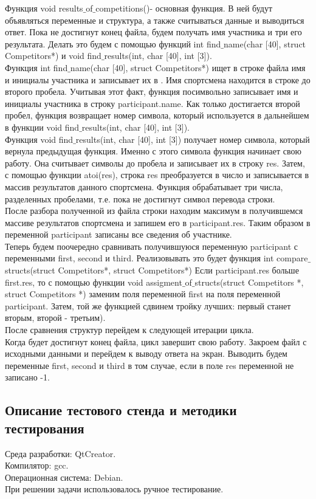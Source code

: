 \documentclass[12pt,a4paper]{report}
\begin{document}
Функция void results$\_$of$\_$competitions()- основная функция. В ней будут объявляться переменные и структура, а также считываться данные и выводиться ответ. Пока не достигнут конец файла, будем получать имя участника и три его результата. Делать это будем с помощью функций int find$\_$name(char [40], struct Competitors*) и void find$\_$results(int, char [40], int [3]).\\
Функция int find$\_$name(char [40], struct Competitors*) ищет в строке файла имя и инициалы участника и записывает их в . Имя спортсмена находится в строке до второго пробела. Учитывая этот факт, функция посимвольно записывает имя и инициалы участника в строку participant.name. Как только достигается второй пробел, функция возвращает номер символа, который используется в дальнейшем в функции void find$\_$results(int, char [40], int [3]).\\
Функция void find$\_$results(int, char [40], int [3]) получает номер символа, который вернула предыдущая функция. Именно с этого символа функция начинает свою работу. Она считывает символы до пробела и записывает их в строку res. Затем, с помощью функции atoi(res), строка res преобразуется в число и записывается в массив результатов данного спортсмена. Функция обрабатывает три числа, разделенных пробелами, т.е. пока не достигнут символ перевода строки. \\
После разбора полученной из файла строки находим максимум в получившемся массиве результатов спортсмена и запишем его в participant.res. Таким образом в переменной participant записаны все сведения об участнике. \\
Теперь будем поочередно сравнивать получившуюся переменную participant с переменными first, second и third. Реализовывать это будет функция int compare$\_$structs(struct Competitors*, struct Competitors*) Если participant.res больше first.res, то с помощью функции void assigment$\_$of$\_$structs(struct Competitors *, struct Competitors *) заменим поля переменной first на поля переменной participant. Затем, той же функцией сдвинем тройку лучших: первый станет вторым, второй - третьим). \\
После сравнения структур перейдем к следующей итерации цикла. \\
Когда будет достигнут конец файла, цикл завершит свою работу. Закроем файл с исходными данными и перейдем к выводу ответа на экран. Выводить будем переменные first, second и third в том случае, если в поле res переменной не записано -1. 
\subsection{Описание тестового стенда и методики тестирования}
Среда разработки: QtCreator.\\
Компилятор: gcc. \\
Операционная система: Debian. \\
При решении задачи использовалось ручное тестирование. 
\end{document}
